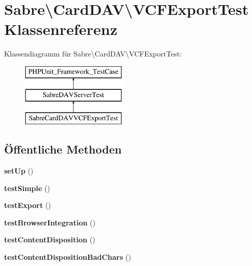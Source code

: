 \hypertarget{class_sabre_1_1_card_d_a_v_1_1_v_c_f_export_test}{}\section{Sabre\textbackslash{}Card\+D\+AV\textbackslash{}V\+C\+F\+Export\+Test Klassenreferenz}
\label{class_sabre_1_1_card_d_a_v_1_1_v_c_f_export_test}
Klassendiagramm für Sabre\textbackslash{}Card\+D\+AV\textbackslash{}V\+C\+F\+Export\+Test\+:\begin{figure}[H]
\begin{center}
\leavevmode
\includegraphics[height=3.000000cm]{class_sabre_1_1_card_d_a_v_1_1_v_c_f_export_test}
\end{center}
\end{figure}
\subsection*{Öffentliche Methoden}
\begin{DoxyCompactItemize}
\item 
\mbox{\label{class_sabre_1_1_card_d_a_v_1_1_v_c_f_export_test_a65b4e5be1d085be4fa07df8ae971c145}} 
{\bfseries set\+Up} ()
\item 
\mbox{\label{class_sabre_1_1_card_d_a_v_1_1_v_c_f_export_test_ab41e92939501629ec3382a98bb437367}} 
{\bfseries test\+Simple} ()
\item 
\mbox{\label{class_sabre_1_1_card_d_a_v_1_1_v_c_f_export_test_a81e2efdc338691f35e6e2e5a26634ec5}} 
{\bfseries test\+Export} ()
\item 
\mbox{\label{class_sabre_1_1_card_d_a_v_1_1_v_c_f_export_test_a6b7bcbfe0154c2878640627f4fc2c1a6}} 
{\bfseries test\+Browser\+Integration} ()
\item 
\mbox{\label{class_sabre_1_1_card_d_a_v_1_1_v_c_f_export_test_af03d357a7416408d706c904ef6c438d9}} 
{\bfseries test\+Content\+Disposition} ()
\item 
\mbox{\label{class_sabre_1_1_card_d_a_v_1_1_v_c_f_export_test_ab8a13dd00fc683935bb224be9cddff6a}} 
{\bfseries test\+Content\+Disposition\+Bad\+Chars} ()
\end{DoxyCompactItemize}
